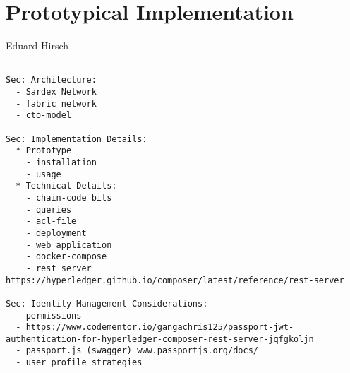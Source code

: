 \chapter{Prototypical Implementation}
\label{ch:prototype}

\vspace{-1cm}
\begin{center}
Eduard Hirsch
\end{center}

\begin{verbatim}

Sec: Architecture:
  - Sardex Network
  - fabric network  
  - cto-model 
    
Sec: Implementation Details:
  * Prototype
    - installation
    - usage
  * Technical Details:
    - chain-code bits
    - queries
    - acl-file
    - deployment
    - web application
    - docker-compose
    - rest server https://hyperledger.github.io/composer/latest/reference/rest-server

Sec: Identity Management Considerations:
  - permissions
  - https://www.codementor.io/gangachris125/passport-jwt-authentication-for-hyperledger-composer-rest-server-jqfgkoljn
  - passport.js (swagger) www.passportjs.org/docs/
  - user profile strategies

\end{verbatim}